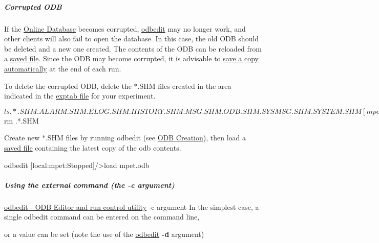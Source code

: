 \hypertarget{RC_odbedit_examples_RC_odbedit_corrupted}{}\subparagraph{Corrupted ODB}\label{RC_odbedit_examples_RC_odbedit_corrupted}
If the \hyperlink{F_MainElements_F_Online_Database_overview}{Online Database} becomes corrupted, \hyperlink{RC_odbedit_utility}{odbedit} may no longer work, and other clients will also fail to open the database. In this case, the old ODB should be deleted and a new one created. The contents of the ODB can be reloaded from a \hyperlink{RC_odbedit_examples_RC_odbedit_save}{saved file}. Since the ODB may become corrupted, it is advisable to \hyperlink{F_Logging_Data_F_Logger_ODB_Dump}{save a copy automatically} at the end of each run. \par
 To delete the corrupted ODB, delete the $\ast$.SHM files created in the area indicated in the \hyperlink{Q_Linux_Q_Linux_Exptab}{exptab file} for your experiment. 
\begin{DoxyCode}
$ ls .*.SHM
.ALARM.SHM  .ELOG.SHM  .HISTORY.SHM  .MSG.SHM  .ODB.SHM  .SYSMSG.SHM  .SYSTEM.SHM
      
[mpet@titan01 ~/online]$ rm .*.SHM
\end{DoxyCode}
 Create new $\ast$.SHM files by running odbedit (see \hyperlink{RC_odbedit_examples_RC_odbedit_create_ODB}{ODB Creation}), then load a \hyperlink{RC_odbedit_examples_RC_odbedit_save}{saved file} containing the latest copy of the odb contents. 
\begin{DoxyCode}
 odbedit
[local:mpet:Stopped]/>load mpet.odb
\end{DoxyCode}


\par
 

 \par


\label{RC_odbedit_examples_idx_script_odbedit}
\hypertarget{RC_odbedit_examples_idx_script_odbedit}{}
 \label{RC_odbedit_examples_idx_odbedit_scripts}
\hypertarget{RC_odbedit_examples_idx_odbedit_scripts}{}
\hypertarget{RC_odbedit_examples_RC_odbedit_extcommand}{}\subparagraph{Using the external command (the  -\/c argument)}\label{RC_odbedit_examples_RC_odbedit_extcommand}
\hyperlink{RC_odbedit_utility}{odbedit -\/ ODB Editor and run control utility} -\/c argument In the simplest case, a single odbedit command can be entered on the command line, 
 or a value can be set (note the use of the \hyperlink{RC_odbedit_utility}{odbedit} {\bfseries -\/d} argument) 


